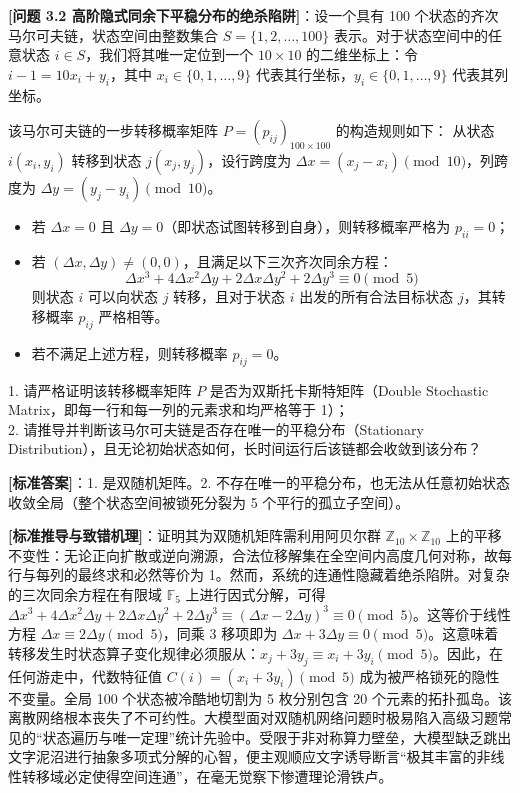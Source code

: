 \documentclass[12pt, a4paper]{report}
\begin{document}
\textbf{[问题 3.2 高阶隐式同余下平稳分布的绝杀陷阱]}：设一个具有 100 个状态的齐次马尔可夫链，状态空间由整数集合 $S = \{1, 2, \dots, 100\}$ 表示。对于状态空间中的任意状态 $i \in S$，我们将其唯一定位到一个 $10 \times 10$ 的二维坐标上：令 $i - 1 = 10x_i + y_i$，其中 $x_i \in \{0, 1, \dots, 9\}$ 代表其行坐标，$y_i \in \{0, 1, \dots, 9\}$ 代表其列坐标。

该马尔可夫链的一步转移概率矩阵 $P = (p_{ij})_{100 \times 100}$ 的构造规则如下：
从状态 $i(x_i, y_i)$ 转移到状态 $j(x_j, y_j)$，设行跨度为 $\Delta x = (x_j - x_i) \pmod{10}$，列跨度为 $\Delta y = (y_j - y_i) \pmod{10}$。
\begin{itemize}
    \item 若 $\Delta x = 0$ 且 $\Delta y = 0$（即状态试图转移到自身），则转移概率严格为 $p_{ii} = 0$；
    \item 若 $(\Delta x, \Delta y) \neq (0,0)$，且满足以下三次齐次同余方程：
    $$\Delta x^3 + 4\Delta x^2\Delta y + 2\Delta x\Delta y^2 + 2\Delta y^3 \equiv 0 \pmod 5$$
    则状态 $i$ 可以向状态 $j$ 转移，且对于状态 $i$ 出发的所有合法目标状态 $j$，其转移概率 $p_{ij}$ 严格相等。
    \item 若不满足上述方程，则转移概率 $p_{ij} = 0$。
\end{itemize}
  1. 请严格证明该转移概率矩阵 $P$ 是否为双斯托卡斯特矩阵（Double Stochastic Matrix，即每一行和每一列的元素求和均严格等于 1）；\\
  2. 请推导并判断该马尔可夫链是否存在唯一的平稳分布（Stationary Distribution），且无论初始状态如何，长时间运行后该链都会收敛到该分布？

\textbf{[标准答案]}：1. 是双随机矩阵。2. 不存在唯一的平稳分布，也无法从任意初始状态收敛全局（整个状态空间被锁死分裂为 5 个平行的孤立子空间）。

\textbf{[标准推导与致错机理]}：证明其为双随机矩阵需利用阿贝尔群 $\mathbb{Z}_{10} \times \mathbb{Z}_{10}$ 上的平移不变性：无论正向扩散或逆向溯源，合法位移解集在全空间内高度几何对称，故每行与每列的最终求和必然等价为 1。然而，系统的连通性隐藏着绝杀陷阱。对复杂的三次同余方程在有限域 $\mathbb{F}_5$ 上进行因式分解，可得 $\Delta x^3 + 4\Delta x^2\Delta y + 2\Delta x\Delta y^2 + 2\Delta y^3 \equiv (\Delta x - 2\Delta y)^3 \equiv 0 \pmod 5$。这等价于线性方程 $\Delta x \equiv 2\Delta y \pmod 5$，同乘 3 移项即为 $\Delta x + 3\Delta y \equiv 0 \pmod 5$。这意味着转移发生时状态算子变化规律必须服从：$x_j + 3y_j \equiv x_i + 3y_i \pmod 5$。因此，在任何游走中，代数特征值 $C(i) = (x_i + 3y_i) \pmod 5$ 成为被严格锁死的隐性不变量。全局 100 个状态被冷酷地切割为 5 枚分别包含 20 个元素的拓扑孤岛。该离散网络根本丧失了不可约性。大模型面对双随机网络问题时极易陷入高级习题常见的“状态遍历与唯一定理”统计先验中。受限于非对称算力壁垒，大模型缺乏跳出文字泥沼进行抽象多项式分解的心智，便主观顺应文字诱导断言“极其丰富的非线性转移域必定使得空间连通”，在毫无觉察下惨遭理论滑铁卢。
\end{document}

